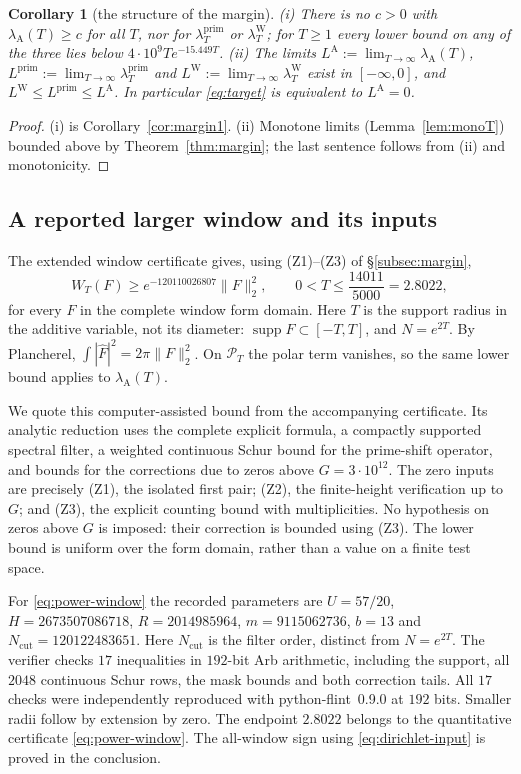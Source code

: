 \documentclass[11pt]{amsart}
\newtheorem{corollary}[theorem]{Corollary}
\theoremstyle{definition}
\theoremstyle{remark}
\newcommand{\supp}{\operatorname{supp}}
\newcommand{\PT}{\mathcal P_T}
\newcommand{\lamP}{\lambda^{\mathrm{prim}}_T}
\newcommand{\lamW}{\lambda^{\mathrm W}_T}
\newcommand{\lamA}{\lambda_{\mathrm A}(T)}
\begin{document}
\begin{corollary}[the structure of the margin]\label{cor:margin2}
\emph{(i)} There is no $c>0$ with $\lamA\ge c$ for all $T$, nor for $\lamP$ or $\lamW$; for $T\ge1$ every
lower bound on any of the three lies below $4\cdot10^9Te^{-15.449T}$.
\emph{(ii)} The limits $L^{\mathrm A}:=\lim_{T\to\infty}\lamA$, $L^{\mathrm{prim}}:=\lim_{T\to\infty}\lamP$ and
$L^{\mathrm W}:=\lim_{T\to\infty}\lamW$ exist in $[-\infty,0]$, and $L^{\mathrm W}\le L^{\mathrm{prim}}\le L^{\mathrm A}$.
In particular \eqref{eq:target} is equivalent to $L^{\mathrm A}=0$.
\end{corollary}
\begin{proof}
(i) is Corollary~\ref{cor:margin1}. (ii) Monotone limits (Lemma~\ref{lem:monoT}) bounded above by
Theorem~\ref{thm:margin}; the last sentence follows from (ii) and monotonicity.
\end{proof}

\subsection{A reported larger window and its inputs}\label{subsec:power-window}
The extended window certificate gives, using (Z1)--(Z3) of \S\ref{subsec:margin},
\begin{equation}\label{eq:power-window}
 W_T(F)\ge e^{-120110026807}\|F\|_2^2,
 \qquad 0<T\le\frac{14011}{5000}=2.8022,
\end{equation}
for every $F$ in the complete window form domain. Here $T$ is the support radius in the additive
variable, not its diameter: $\supp F\subset[-T,T]$, and $N=e^{2T}$.
By Plancherel,
$\int|\widehat F|^2=2\pi\|F\|_2^2$.
On $\PT$ the polar term vanishes, so the same lower bound applies to $\lamA$.

We quote this computer-assisted bound from the accompanying certificate. Its analytic reduction uses the complete
explicit formula, a compactly supported spectral filter, a weighted continuous Schur bound for the
prime-shift operator, and bounds for the corrections due to zeros above
$G=3\cdot10^{12}$. The zero inputs are precisely (Z1), the isolated first pair;
(Z2), the finite-height verification up to $G$; and (Z3), the explicit counting bound with multiplicities.
No hypothesis on zeros above $G$ is imposed: their correction is bounded using (Z3).
The lower bound is uniform over the form domain, rather than a value on a finite test space.

For \eqref{eq:power-window} the recorded parameters are
$U=57/20$, $H=2673507086718$, $R=2014985964$, $m=9115062736$, $b=13$ and
$N_{\mathrm{cut}}=120122483651$. Here $N_{\mathrm{cut}}$ is the filter order, distinct from $N=e^{2T}$.
The verifier checks $17$ inequalities in $192$-bit Arb arithmetic, including the support,
all $2048$ continuous Schur rows, the mask bounds and both correction tails.
All $17$ checks were independently reproduced with python-flint~0.9.0 at $192$ bits.
Smaller radii follow by extension by zero. The endpoint $2.8022$ belongs
to the quantitative certificate \eqref{eq:power-window}. The all-window
sign using \eqref{eq:dirichlet-input} is proved in the conclusion.
\end{document}
